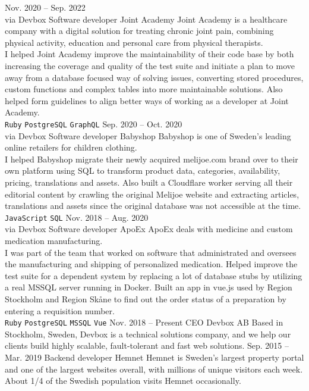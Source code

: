 \documentclass[9pt]{template} %
\begin{document}
\begin{entrylist}
  \entry
    {Nov. 2020 -- Sep. 2022\\\footnotesize{via Devbox}}
    {Software developer}
    {Joint Academy}
    {Joint Academy is a healthcare company with a digital solution for treating chronic joint pain, combining physical activity, education and personal care from physical therapists.\\

      I helped Joint Academy improve the maintainability of their code base by both increasing the coverage and quality of the test suite and initiate a plan to move away from a database focused way of solving issues, converting stored procedures, custom functions and complex tables into more maintainable solutions. Also helped form guidelines to align better ways of working as a developer at Joint Academy.\\
      \texttt{Ruby}\slashsep
      \texttt{PostgreSQL}\slashsep
      \texttt{GraphQL}
    }
  \entry
    {Sep. 2020 -- Oct. 2020\\\footnotesize{via Devbox}}
    {Software developer}
    {Babyshop}
    {Babyshop is one of Sweden's leading online retailers for children clothing.\\

      I helped Babyshop migrate their newly acquired melijoe.com brand over to their own platform using SQL to transform product data, categories, availability, pricing, translations and assets. Also built a Cloudflare worker serving all their editorial content by crawling the original Melijoe website and extracting articles, translations and assets since the original database was not accessible at the time.\\
      \texttt{JavaScript}\slashsep
      \texttt{SQL}
    }
  \entry
    {Nov. 2018 -- Aug. 2020\\\footnotesize{via Devbox}}
    {Software developer}
    {ApoEx}
    {ApoEx deals with medicine and custom medication manufacturing.\\

      I was part of the team that worked on software that administrated and oversees the manufacturing and shipping of personalized medication. Helped improve the test suite for a dependent system by replacing a lot of database stubs by utilizing a real MSSQL server running in Docker. Built an app in vue.js used by Region Stockholm and Region Skåne to find out the order status of a preparation by entering a requisition number.\\
      \texttt{Ruby}\slashsep
      \texttt{PostgreSQL}\slashsep
      \texttt{MSSQL}\slashsep
      \texttt{Vue}
    }
  \entry
    {Nov. 2018 -- Present}
    {CEO}
    {Devbox AB}
    {Based in Stockholm, Sweden, Devbox is a technical solutions company, and we help our clients build highly scalable, fault-tolerant and fast web solutions.}
  \entry
    {Sep. 2015 -- Mar. 2019}
    {Backend developer}
    {Hemnet}
    {Hemnet is Sweden’s largest property portal and one of the largest websites overall, with millions of unique visitors each week. About 1/4 of the Swedish population visits Hemnet occasionally.\\

}
\end{entrylist}
\end{document}
